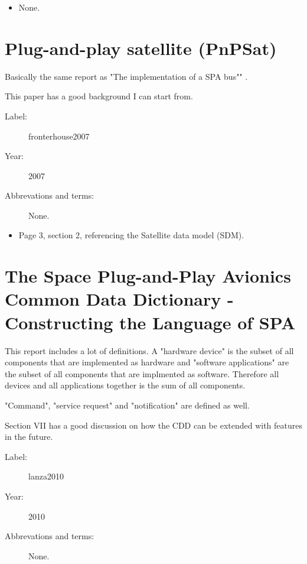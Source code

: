 \begin{itemize}
    \item None.
\end{itemize}

\section{Plug-and-play satellite (PnPSat)}
Basically the same report as "The implementation of a SPA bus""
\cite{martin2008}.

This paper has a good background I can start from.

\begin{description}
    \item[Label:] fronterhouse2007 \cite{fronterhouse2007}
    \item[Year:] 2007
    \item[Abbrevations and terms:] None.
\end{description}

\begin{itemize}
    \item Page 3, section 2, referencing the Satellite data model (SDM).
\end{itemize}

\section{The Space Plug-and-Play Avionics Common Data Dictionary - Constructing
the Language of SPA}

This report includes a lot of definitions. A "hardware device" is the subset of
all components that are implemented as hardware and "software applications" are
the subset of all components that are implmented as software. Therefore all
devices and all applications together is the sum of all components.

"Command", "service request" and "notification" are defined as well.

Section VII has a good discussion on how the CDD can be extended with features
in the future.

\begin{description}
    \item[Label:] lanza2010 \cite{lanza2010}
    \item[Year:] 2010
    \item[Abbrevations and terms:] None.
\end{description}

